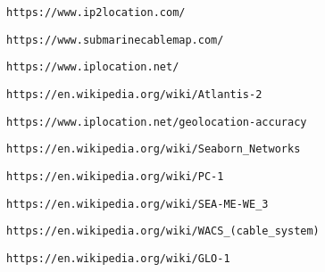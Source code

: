 \begin{thebibliography}{99}

  \texttt{https://www.ip2location.com/}

	\texttt{https://www.submarinecablemap.com/}

	\texttt{https://www.iplocation.net/}

	\texttt{https://en.wikipedia.org/wiki/Atlantis-2}

	\texttt{https://www.iplocation.net/geolocation-accuracy}

	\texttt{https://en.wikipedia.org/wiki/Seaborn\_Networks}

	\texttt{https://en.wikipedia.org/wiki/PC-1}

	\texttt{https://en.wikipedia.org/wiki/SEA-ME-WE\_3}

	\texttt{https://en.wikipedia.org/wiki/WACS\_(cable\_system)}

	\texttt{https://en.wikipedia.org/wiki/GLO-1}

\end{thebibliography}